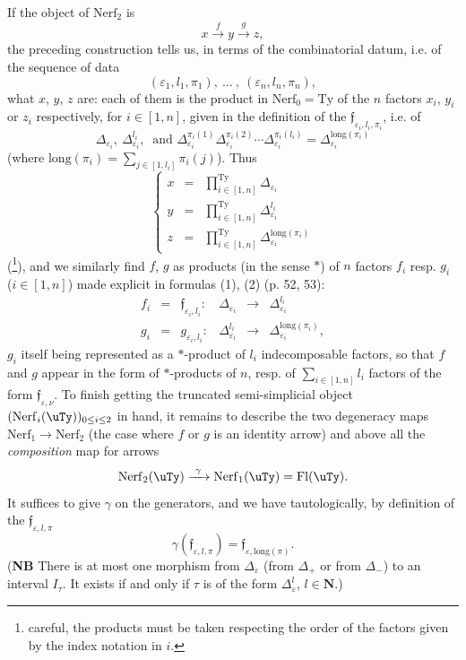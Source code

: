 If the object of $\mathrm{Nerf}_2$ is
\[
x\xrightarrow{\ f\ }y\xrightarrow{\ g\ }z,
\]
the preceding construction tells us, in terms of the combinatorial datum, i.e. of the sequence of data
\[
(\varepsilon_1,l_1,\pi_1),\ \dots\ ,\ (\varepsilon_n,l_n,\pi_n),
\]
what $x$, $y$, $z$ are: each of them is the product in $\mathrm{Nerf}_0=\mathrm{Ty}$ of the $n$ factors $x_i$, $y_i$ or $z_i$ respectively, for $i\in[1,n]$, given in the definition of the $\mathfrak{f}_{\varepsilon_i,l_i,\pi_i}$, i.e. of
\[
\Delta_{\varepsilon_i},\ \Delta^{l_i}_{\varepsilon_i},\ \text{ and }\Delta^{\pi_i(1)}_{\varepsilon_i}\Delta^{\pi_i(2)}_{\varepsilon_i}\cdots\Delta^{\pi_i(l_i)}_{\varepsilon_i}=\Delta^{\mathrm{long}(\pi_i)}_{\varepsilon_i}
\]
(where $\mathrm{long}(\pi_i)=\sum_{j\in[1,l_i]}\pi_i(j)$). Thus
\[
\left\{
\begin{array}{lcl}
x & = & \prod^{\mathrm{Ty}}_{i\in[1,n]}\Delta_{\varepsilon_i}\\[4pt]
y & = & \prod^{\mathrm{Ty}}_{i\in[1,n]}\Delta^{l_i}_{\varepsilon_i}\\[4pt]
z & = & \prod^{\mathrm{Ty}}_{i\in[1,n]}\Delta^{\mathrm{long}(\pi_i)}_{\varepsilon_i}
\end{array}
\right.
\]
(\footnote[16]{careful, the products must be taken respecting the order of the factors given by the index notation in $i$.}), and we similarly find $f$, $g$ as products (in the sense $*$) of $n$ factors $f_i$ resp. $g_i$ ($i\in[1,n]$) made explicit in formulas (1), (2) (p. 52, 53):
\[
\begin{array}{lclccl}
f_i & = & \mathfrak{f}_{\varepsilon_i,l_i} : & \Delta_{\varepsilon_i} & \longrightarrow & \Delta^{l_i}_{\varepsilon_i}\\[4pt]
g_i & = & g_{\varepsilon_i,l_i} : & \Delta^{l_i}_{\varepsilon_i} & \longrightarrow & \Delta^{\mathrm{long}(\pi_i)}_{\varepsilon_i}, %
\end{array}
\]
$g_i$ itself being represented as a $*$-product of $l_i$ indecomposable factors, so that $f$ and $g$ appear in the form
of $*$-products of $n$, resp. of $\sum_{i\in[1,n]}l_i$ factors of the form $\mathfrak{f}_{\varepsilon,\nu}$. To finish getting the truncated semi-simplicial object $(\mathrm{Nerf}_i(\uTy))_{0\leq i\leq 2}$ in hand, it remains to describe the two degeneracy maps $\mathrm{Nerf}_1\longrightarrow\mathrm{Nerf}_2$ (the case where $f$ or $g$ is an identity arrow) and above all the \textit{composition} map for arrows
\[
\mathrm{Nerf}_2(\uTy)\xrightarrow{\ \gamma\ }\mathrm{Nerf}_1(\uTy)=\mathrm{Fl}(\uTy).
\]
It suffices to give $\gamma$ on the generators, and we have tautologically, by definition of the $\mathfrak{f}_{\varepsilon,l,\pi}$
\[
\gamma(\mathfrak{f}_{\varepsilon,l,\pi})=\mathfrak{f}_{\varepsilon,\mathrm{long}(\pi)}.
\]
(\textbf{NB} There is at most one morphism from $\Delta_\varepsilon$ (from $\Delta_+$ or from $\Delta_-$) to an interval $I_\tau$. It exists if and only if $\tau$ is of the form $\Delta^l_\varepsilon$, $l\in\mathbf{N}$.)

